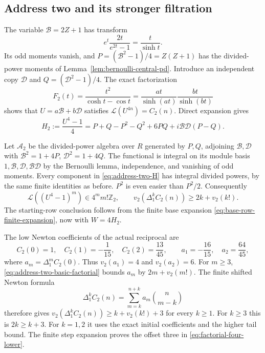 \subsection{Address two and its stronger filtration}

The variable $\mathcal B=2Z+1$ has transform
\[
 e^t\frac{2t}{e^{2t}-1}=\frac{t}{\sinh t}.
\]
Its odd moments vanish, and
$P=(\mathcal B^2-1)/4=Z(Z+1)$ has the divided-power moments of
Lemma~\ref{lem:bernoulli-central-pd}. Introduce an independent copy
$\mathcal D$ and $Q=(\mathcal D^2-1)/4$. The exact factorization
\begin{equation}
 F_2(t)=\frac{t^2}{\cosh t-\cos t}
       =\frac{at}{\sinh(at)}\frac{bt}{\sinh(bt)}
 \label{eq:address-two-factorization}
\end{equation}
shows that $U=a\mathcal B+b\mathcal D$ satisfies
$\mathcal L(U^{4n})=C_2(n)$. Direct expansion gives
\begin{equation}
 H_2:=\frac{U^4-1}{4}
     =P+Q-P^2-Q^2+6PQ+i\mathcal B\mathcal D(P-Q).
 \label{eq:address-two-H}
\end{equation}

Let $\mathcal A_2$ be the divided-power algebra over $R$ generated by
$P,Q$, adjoining $\mathcal B,\mathcal D$ with
$\mathcal B^2=1+4P$, $\mathcal D^2=1+4Q$.
The functional is integral on its module basis
$1,\mathcal B,\mathcal D,\mathcal B\mathcal D$ by the Bernoulli lemma,
independence, and vanishing of odd moments. Every component in
\eqref{eq:address-two-H} has integral divided powers, by the same
finite identities as before. $P^2$ is even easier than $P^2/2$.
Consequently
\begin{equation}
 \mathcal L((U^4-1)^m)\in4^m m!\mathbb Z_2,
 \qquad
 v_2(\Delta_1^kC_2(n))\geq2k+v_2(k!).
 \label{eq:address-two-basic-factorial}
\end{equation}
The starting-row conclusion follows from the finite base expansion
\eqref{eq:base-row-finite-expansion}, now with $W=4H_2$.

The low Newton coefficients of the actual reciprocal are
\begin{equation}
 C_2(0)=1,\quad C_2(1)=-\frac1{15},\quad C_2(2)=\frac{13}{45},
 \qquad a_1=-\frac{16}{15},\quad a_2=\frac{64}{45},
 \label{eq:address-two-initial-newton}
\end{equation}
where $a_m=\Delta_1^m C_2(0)$. Thus $v_2(a_1)=4$ and $v_2(a_2)=6$.
For $m\geq3$, \eqref{eq:address-two-basic-factorial} bounds $a_m$ by
$2m+v_2(m!)$. The finite shifted Newton formula
\begin{equation}
 \Delta_1^kC_2(n)=\sum_{m=k}^{n+k}a_m\binom n{m-k}
 \label{eq:shifted-newton-finite}
\end{equation}
therefore gives
$v_2(\Delta_1^kC_2(n))\geq k+v_2(k!)+3$ for every $k\geq1$.
For $k\geq3$ this is $2k\geq k+3$. For $k=1,2$ it uses the exact
initial coefficients and the higher tail bound. The finite step
expansion proves the offset three in
\eqref{eq:factorial-four-lower}.

